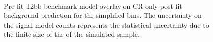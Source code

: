 \begin{figure}[!h]
    \centering
     \\
    \caption{
        Pre-fit T2bb benchmark model overlay on CR-only post-fit
        background prediction for the simplified bins. The uncertainty on
        the signal model counts represents the statistical uncertainty due
        to the finite size of the of the simulated sample.
    }
    \label{fig:T2bb_MR_simp}
\end{figure}

